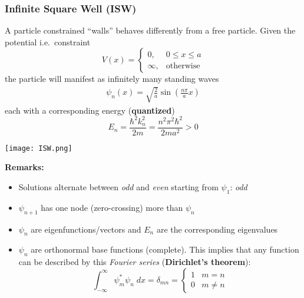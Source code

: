 \subsubsection{Infinite Square Well (ISW)}\label{ssec:ISW}
A particle constrained ``walls'' behaves differently from a free particle. Given the potential i.e.\ constraint
\noindent\begin{equation*}
    V(x)=\begin{cases}0,&0\le x\le a\\\infty,&\text{otherwise}\end{cases}
\end{equation*}
the particle will manifest as infinitely many standing waves
\noindent\begin{align*}
    \psi_{n}(x)=\sqrt{\frac{2}{a}}\sin\left(\frac{n\pi}{a}x\right)
\end{align*}
each with a corresponding energy (\textbf{quantized})
\noindent\begin{equation*}
    E_{n}=\frac{\hbar^{2}k_{n}^{2}}{2m}=\frac{n^{2}\pi^{2}\hbar^{2}}{2ma^{2}} > 0
\end{equation*}

\begin{center}
    \texttt{[image: ISW.png]}
\end{center}

\textbf{Remarks:}
\begin{itemize}
    \item Solutions alternate between \textit{odd} and \textit{even} starting from $\psi_1$: \textit{odd}
    \item $\psi_{n+1}$ has one node (zero-crossing) more than $\psi_n$
    \item $\psi_n$ are eigenfunctions/vectors and $E_n$ are the corresponding eigenvalues
    \item $\psi_n$ are orthonormal base functions (complete). This implies that any function can be  described by this \textit{Fourier series} (\textbf{Dirichlet's theorem}):
          \noindent\begin{equation*}
              \int_{-\infty}^{\infty} \psi_m^*\psi_n\; dx = \delta_{mn}= \begin{cases}
                  1 & m=n     \\
                  0 & m\neq n
              \end{cases}
          \end{equation*}
\end{itemize}

